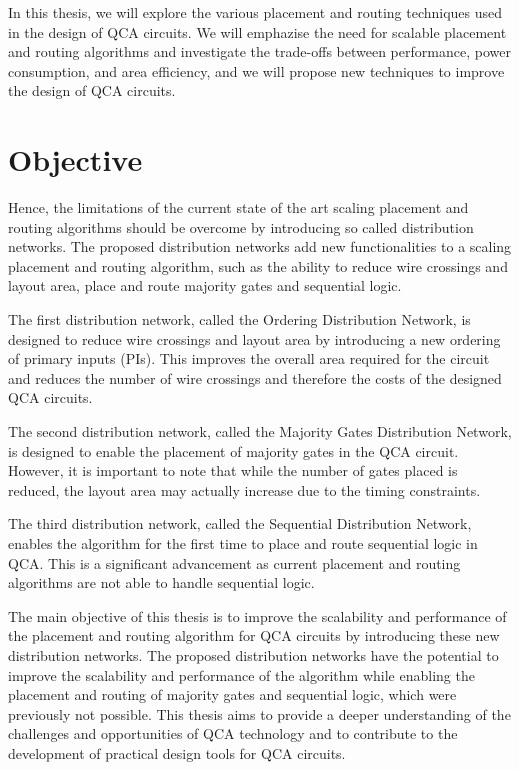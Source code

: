 In this thesis, we will explore the various placement and routing techniques used in the design of QCA circuits. We will emphazise the need for scalable placement and routing algorithms and investigate the trade-offs between performance, power consumption, and area efficiency, and we will propose new techniques to improve the design of QCA circuits.

\section{Objective}
Hence, the limitations of the current state of the art scaling placement and routing algorithms should be overcome by introducing so called distribution networks. The proposed distribution networks add new functionalities to a scaling placement and routing algorithm, such as the ability to reduce wire crossings and layout area, place and route majority gates and sequential logic.

The first distribution network, called the Ordering Distribution Network, is designed to reduce wire crossings and layout area by introducing a new ordering of primary inputs (PIs). This improves the overall area required for the circuit and reduces the number of wire crossings and therefore the costs of the designed QCA circuits.

The second distribution network, called the Majority Gates Distribution Network, is designed to enable the placement of majority gates in the QCA circuit. However, it is important to note that while the number of gates placed is reduced, the layout area may actually increase due to the timing constraints.

The third distribution network, called the Sequential Distribution Network, enables the algorithm for the first time to place and route sequential logic in QCA. This is a significant advancement as current placement and routing algorithms are not able to handle sequential logic.

The main objective of this thesis is to improve the scalability and performance of the placement and routing algorithm for QCA circuits by introducing these new distribution networks. The proposed distribution networks have the potential to improve the scalability and performance of the algorithm while enabling the placement and routing of majority gates and sequential logic, which were previously not possible. This thesis aims to provide a deeper understanding of the challenges and opportunities of QCA technology and to contribute to the development of practical design tools for QCA circuits.


